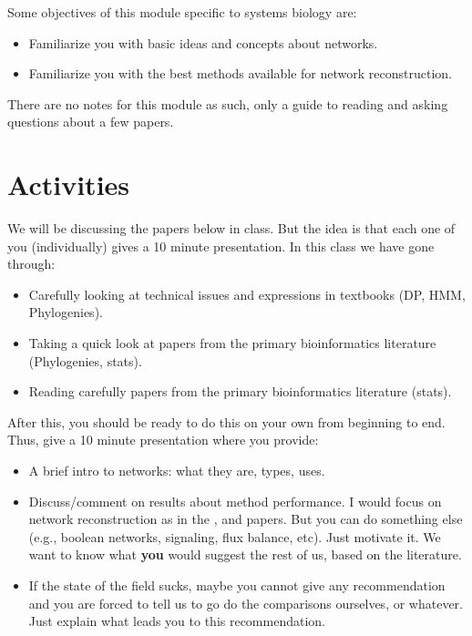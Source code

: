 Some objectives of this module specific to systems biology are:

\begin{itemize}
\item Familiarize you with basic ideas and concepts about networks.

\item Familiarize you with the best methods available for network
  reconstruction.

\end{itemize}



There are no notes for this module as such, only a guide to reading and
asking questions about a few papers.




\section{Activities}


We will be discussing the papers below in class. But the idea is that each
one of you (individually) gives a 10 minute presentation.  In this class
we have gone through:

\begin{itemize}
\item Carefully looking at technical issues and expressions in textbooks
  (DP, HMM, Phylogenies).
\item Taking a quick look at papers from the primary bioinformatics
  literature (Phylogenies, stats).
\item Reading carefully papers from the primary bioinformatics literature
  (stats).
\end{itemize}

After this, you should be ready to do this on your own from beginning to
end. Thus, give a 10 minute presentation where you provide:

\begin{itemize}
\item A brief intro to networks: what they are, types, uses.
\item Discuss/comment on results about method performance. I would focus
  on network reconstruction as in the \cite{Marbach2012},
  \cite{Marbach2010} and \cite{Narendra2011} papers. But you can do
  something else (e.g., boolean networks, signaling, flux balance,
  etc). Just motivate it. We want to know what \textbf{you} would suggest
  the rest of us, based on the literature.
\item If the state of the field sucks, maybe you cannot give any
  recommendation and you are forced to tell us to go do the comparisons
  ourselves, or whatever. Just explain what leads you to this
  recommendation. 
\end{itemize}


